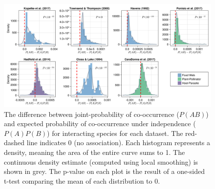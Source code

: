 \documentclass[11pt]{article}
\makeatletter
\def\maxwidth{\ifdim\Gin@nat@width>\linewidth\linewidth
\else\Gin@nat@width\fi}
\let\Oldincludegraphics\includegraphics
\renewcommand{\includegraphics}[1]{\Oldincludegraphics[width=\maxwidth]{#1}}
\makeatother
\begin{document}
\begin{figure}
\hypertarget{fig:mangal}{%
\centering
\includegraphics{./figures/fig2.png}
\caption{The difference between joint-probability of co-occurrence
(\(P(AB)\)) and expected probability of co-occurrence under independence
(\(P(A)P(B)\)) for interacting species for each dataset. The red-dashed
line indicates 0 (no association). Each histogram represents a density,
meaning the area of the entire curve sums to 1. The continuous density
estimate (computed using local smoothing) is shown in grey. The p-value
on each plot is the result of a one-sided t-test comparing the mean of
each distribution to 0.}\label{fig:mangal}
}
\end{figure}
\end{document}
